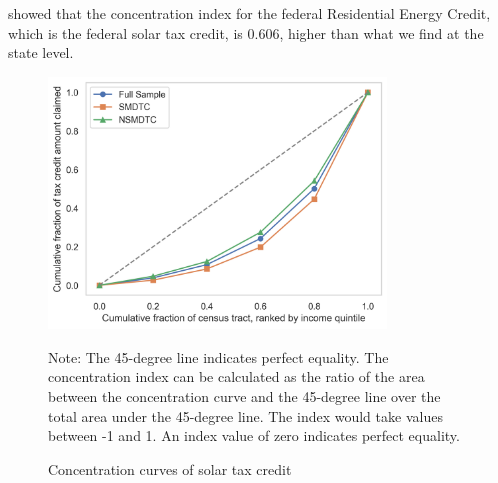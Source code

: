 \documentclass[11pt,twoside,letterpaper]{article}
\begin{document}
\textcite{borenstein_distributional_2016} showed that the concentration index for the federal Residential Energy Credit, which is the federal solar tax credit, is 0.606, higher than what we find at the state level. %

\begin{figure}[!ht]
    \centering
\includegraphics[width=0.8\textwidth]{figures/credit_claim_amount_distribution_by_income.png}
    \caption{Concentration curves of solar tax credit}
    \label{fig:credit_claim_distribution}
    \begin{flushleft}
        \footnotesize Note: The 45-degree line indicates perfect equality. The concentration index can be calculated as the ratio of the area between the concentration curve and the 45-degree line over the total area under the 45-degree line. The index would take values between -1 and 1. An index value of zero indicates perfect equality. 
    \end{flushleft}
\end{figure}
\end{document}
